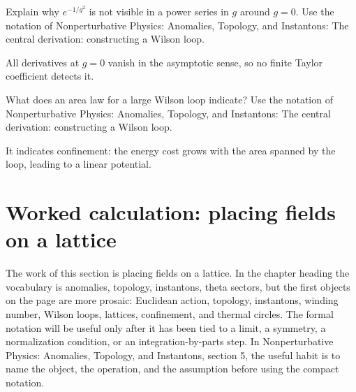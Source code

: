 \begin{exercise}
Explain why \(e^{-1/g^2}\) is not visible in a power series in \(g\) around \(g=0\).  Use the notation of Nonperturbative Physics: Anomalies, Topology, and Instantons: The central derivation: constructing a Wilson loop.
\begin{answer}
All derivatives at \(g=0\) vanish in the asymptotic sense, so no finite Taylor coefficient detects it.
\end{answer}
\end{exercise}

\begin{exercise}
What does an area law for a large Wilson loop indicate?  Use the notation of Nonperturbative Physics: Anomalies, Topology, and Instantons: The central derivation: constructing a Wilson loop.
\begin{answer}
It indicates confinement: the energy cost grows with the area spanned by the loop, leading to a linear potential.
\end{answer}
\end{exercise}



\section{Worked calculation: placing fields on a lattice}













The work of this section is placing fields on a lattice.  In the chapter heading the vocabulary is anomalies, topology, instantons, theta sectors, but the first objects on the page are more prosaic: Euclidean action, topology, instantons, winding number, Wilson loops, lattices, confinement, and thermal circles.  The formal notation will be useful only after it has been tied to a limit, a symmetry, a normalization condition, or an integration-by-parts step.  In Nonperturbative Physics: Anomalies, Topology, and Instantons, section 5, the useful habit is to name the object, the operation, and the assumption before using the compact notation.

